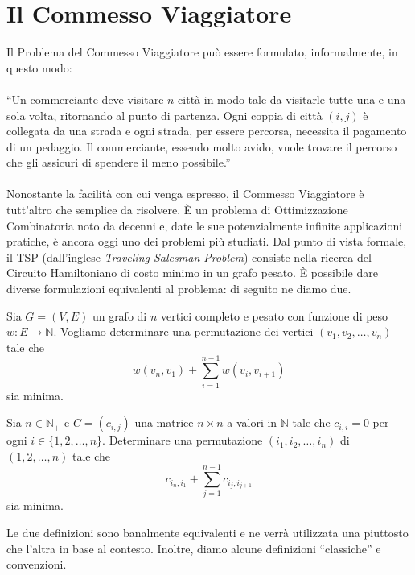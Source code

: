 \chapter{Il Commesso Viaggiatore}

Il Problema del Commesso Viaggiatore può essere formulato, informalmente, in questo modo:\\
\ \\
``Un commerciante deve visitare $n$ città in modo tale da visitarle tutte una e una sola volta, 
ritornando al punto di partenza. Ogni coppia di città $(i,j)$ è collegata da una strada e ogni strada, 
per essere percorsa, necessita il pagamento di un pedaggio. Il commerciante, essendo molto avido, vuole 
trovare il percorso che gli assicuri di spendere il meno possibile.''
\ \\
\ \\
Nonostante la facilità con cui venga espresso, il Commesso Viaggiatore è tutt'altro che semplice
da risolvere. È un problema di Ottimizzazione Combinatoria noto da decenni e, date le sue potenzialmente 
infinite applicazioni pratiche, è ancora oggi uno dei problemi più studiati. Dal punto di vista formale, 
il TSP (dall'inglese \textit{Traveling Salesman Problem}) consiste nella ricerca del Circuito Hamiltoniano di 
costo minimo in un grafo pesato. È possibile dare diverse formulazioni equivalenti al problema: di seguito
ne diamo due.

\begin{definition}
    Sia $G=(V,E)$ un grafo di $n$ vertici completo e pesato con funzione di peso $w:E \rightarrow \mathbb{N}$.
    Vogliamo determinare una permutazione dei vertici $(v_1,v_2,\dots,v_n)$ tale che
    $$w(v_n,v_1) + \displaystyle\sum_{i=1}^{n-1}{w(v_i,v_{i+1})}$$
    sia minima.
\end{definition}

\begin{definition}
    Sia $n \in \mathbb{N}_+$ e $C=(c_{i,j})$ una matrice $n\times{}n$ a valori in $\mathbb{N}$ tale che 
    $c_{i,i}=0$ per ogni $i\in\{1,2,\dots,n\}$. Determinare una permutazione $(i_1,i_2,\dots,i_n)$
    di $(1,2,\dots,n)$ tale che
    $$c_{i_n,i_1} + \displaystyle\sum_{j=1}^{n-1}{c_{i_j,i_{j+1}}}$$
    sia minima.
\end{definition}

Le due definizioni sono banalmente equivalenti e ne verrà utilizzata una piuttosto che l'altra in base 
al contesto. Inoltre, diamo alcune definizioni ``classiche'' e convenzioni.

